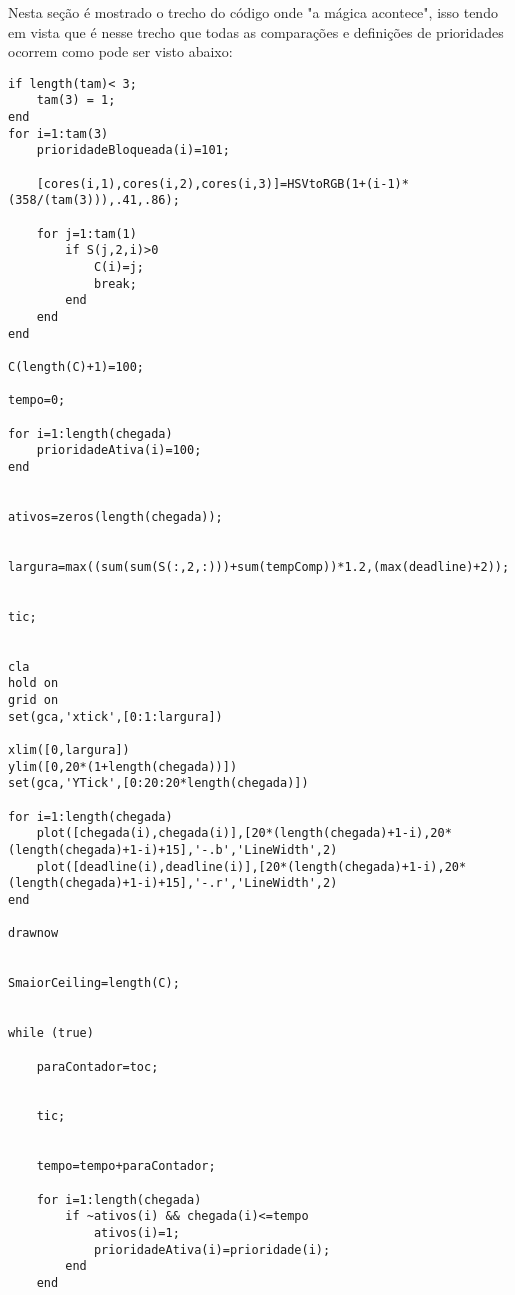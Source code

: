 Nesta seção é mostrado o trecho do código onde "a mágica acontece", isso tendo em vista que é nesse trecho que todas as comparações e definições de prioridades ocorrem como pode ser visto abaixo:

\begin{lstlisting}
if length(tam)< 3;
    tam(3) = 1;
end
for i=1:tam(3)
    prioridadeBloqueada(i)=101;
    
    [cores(i,1),cores(i,2),cores(i,3)]=HSVtoRGB(1+(i-1)*(358/(tam(3))),.41,.86);
    
    for j=1:tam(1)
        if S(j,2,i)>0
            C(i)=j;
            break;
        end
    end
end

C(length(C)+1)=100;

tempo=0;

for i=1:length(chegada)
    prioridadeAtiva(i)=100;
end


ativos=zeros(length(chegada));


largura=max((sum(sum(S(:,2,:)))+sum(tempComp))*1.2,(max(deadline)+2));


tic;


cla
hold on
grid on
set(gca,'xtick',[0:1:largura])

xlim([0,largura])
ylim([0,20*(1+length(chegada))])
set(gca,'YTick',[0:20:20*length(chegada)])

for i=1:length(chegada)
    plot([chegada(i),chegada(i)],[20*(length(chegada)+1-i),20*(length(chegada)+1-i)+15],'-.b','LineWidth',2)
    plot([deadline(i),deadline(i)],[20*(length(chegada)+1-i),20*(length(chegada)+1-i)+15],'-.r','LineWidth',2)
end

drawnow


SmaiorCeiling=length(C);


while (true)

    paraContador=toc;
      

    tic;
    

    tempo=tempo+paraContador;

    for i=1:length(chegada)
        if ~ativos(i) && chegada(i)<=tempo
            ativos(i)=1;
            prioridadeAtiva(i)=prioridade(i);
        end            
    end
    


\end{lstlisting}
